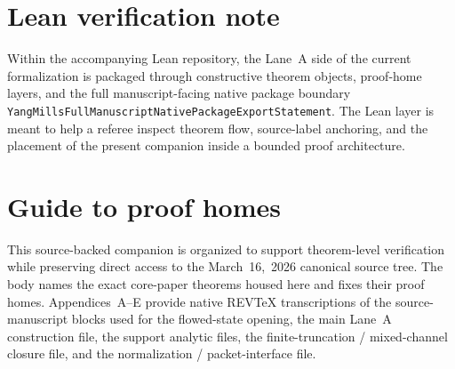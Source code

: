 \documentclass[preprint,aip,jmp,amsmath,amssymb,nofootinbib]{revtex4-2}
\begin{document}

\begin{abstract}
This companion is the source-backed proof home for the Lane~A sharp-local construction cited by the core paper. It is assembled directly from the canonical March~16,~2026 LaTeX source tree and houses the flowed continuum state, the exact-dimension quotient machinery, the one-shell transport and finite-truncation inverse package, the finite-cap mixed-correlator bridge, the finite-cap sharp-local extension, the inductive-union passage, bounded-base cyclicity in the reconstructed sharp-local Hilbert space, and a theorem-level state-construction ledger for the functional backbone. Appendices~A--E carry native REV\TeX{} transcriptions of the source-manuscript Section~4 file, the principal Lane~A construction file, the support analytic files, the finite-truncation interface / mixed-channel closure file, and the normalization / packet-interface file. The companion is uniform throughout in native REV\TeX{} form. The accompanying Lean repository supplies a checkable manuscript-facing route map for this constructive heart within the full proof architecture.
\end{abstract}

\maketitle
\section*{Lean verification note}
Within the accompanying Lean repository, the Lane~A side of the current
formalization is packaged through constructive theorem objects, proof-home
layers, and the full manuscript-facing native package boundary
\texttt{YangMillsFullManuscriptNativePackageExportStatement}. The Lean layer is
meant to help a referee inspect theorem flow, source-label anchoring, and the
placement of the present companion inside a bounded proof architecture.

\section*{Guide to proof homes}
This source-backed companion is organized to support theorem-level verification while preserving direct access to the March~16,~2026 canonical source tree. The body names the exact core-paper theorems housed here and fixes their proof homes. Appendices~A--E provide native REV\TeX{} transcriptions of the source-manuscript blocks used for the flowed-state opening, the main Lane~A construction file, the support analytic files, the finite-truncation / mixed-channel closure file, and the normalization / packet-interface file.
\end{document}
